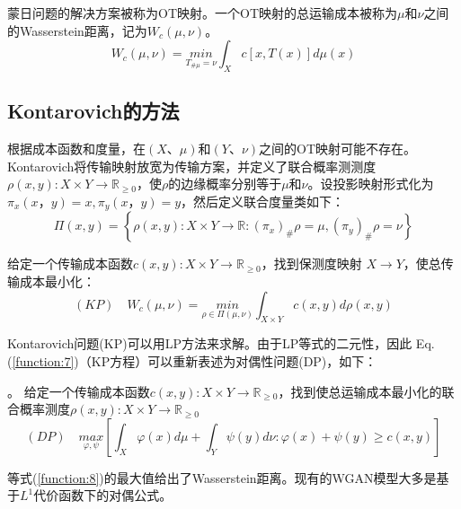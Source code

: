 \begin{definition}[OT映射]
	蒙日问题的解决方案被称为OT映射。一个OT映射的总运输成本被称为$\mu$和$\nu$之间的Wasserstein距离，记为$W_c(\mu,\nu)$。
	\begin{equation}
		W_c(\mu,\nu)= \underset{T_{\# \mu}=\nu}{min} \int_X c[x,T(x)]d\mu(x)  
		\label{function:5}
	\end{equation}
	\label{definition:3.2}
\end{definition}

\subsection{Kontarovich的方法}

根据成本函数和度量，在$(X、\mu)$和$(Y、\nu)$之间的OT映射可能不存在。Kontarovich将传输映射放宽为传输方案，并定义了联合概率测测度$\rho(x,y): X \times Y \to \mathbb{R}_{\ge 0}$，使$\rho$的边缘概率分别等于$\mu$和$\nu$。设投影映射形式化为$\pi_x(x，y)=x, \pi_y(x，y)=y$，然后定义联合度量类如下：
\begin{equation}
	\Pi(x,y)= \left\{ \rho(x,y): X\times Y \to \mathbb{R} : (\pi_x)_{\#}\rho=\mu, (\pi_y)_{\#}\rho=\nu \right\} 
	\label{function:6}
\end{equation}

\begin{problem}[Kontarovich;KP]
	给定一个传输成本函数$c(x,y): X \times Y\to\mathbb{R}_{\ge 0}$，找到保测度映射 $X \to Y$，使总传输成本最小化：
	\begin{equation}
		(KP) \quad W_c (\mu,\nu)= \underset{\rho \in \Pi(\mu,\nu)}{min} \int_{X \times Y} c(x,y)d\rho(x,y)  
		\label{function:7}
	\end{equation}
	\label{problem:3.2}
\end{problem}

Kontarovich问题(KP)可以用LP方法来求解。由于LP等式的二元性，因此 Eq.(\ref{function:7})（KP方程）可以重新表述为对偶性问题(DP)，如下：
\begin{problem}[对偶;DP]。
	给定一个传输成本函数$c(x,y):X\times Y \to \mathbb{R}_{\ge0}$，找到使总运输成本最小化的联合概率测度$\rho(x,y): X \times Y \to \mathbb{R}_{\ge0}$
	\begin{equation}
		(DP) \quad \underset{\varphi , \psi }{max}\left [ \int_X \varphi (x)d\mu + \int_Y \psi (y)d\nu : \varphi(x)+\psi(y) \ge c(x,y) \right ]   
		\label{function:8}
	\end{equation}
	\label{problem:3.3}
	
	等式(\ref{function:8})的最大值给出了Wasserstein距离。现有的WGAN模型大多是基于$L^1$代价函数下的对偶公式。
\end{problem}

